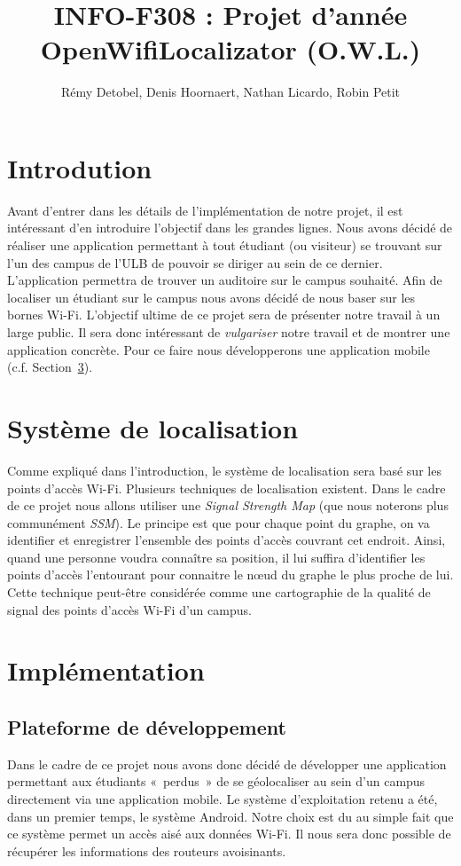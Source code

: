 \documentclass[a4paper,11pt]{article}
\title{INFO-F308 : Projet d'année \\ OpenWifiLocalizator (O.W.L.)}
\author{Rémy Detobel, Denis Hoornaert, Nathan Licardo, Robin Petit}
\begin{document}
\maketitle

\section{Introdution}
	Avant d'entrer dans les détails de l'implémentation de notre projet, il est intéressant d'en introduire l'objectif dans les grandes lignes.
	Nous avons décidé de réaliser une application permettant à tout étudiant (ou visiteur) se trouvant sur l'un des campus de l'ULB de pouvoir se diriger au sein de ce dernier.
	L'application permettra de trouver un auditoire sur le campus souhaité. Afin de localiser un étudiant sur le campus nous avons décidé de nous baser sur les bornes Wi-Fi.
	L'objectif ultime de ce projet sera de présenter notre travail à un large public. Il sera donc intéressant de \textit{vulgariser} notre travail et de montrer
	une application concrète. Pour ce faire nous développerons une application mobile (c.f. Section~\ref{sec:Implémentation}).

\section{Système de localisation}
	Comme expliqué dans l'introduction, le système de localisation sera basé sur les points d'accès Wi-Fi. Plusieurs techniques de localisation existent.
	Dans le cadre de ce projet nous allons utiliser une \textit{Signal Strength Map} (que nous noterons plus communément \textit{SSM}).
	Le principe est que pour chaque point du graphe, on va identifier et enregistrer l'ensemble des points d'accès couvrant cet endroit.
	Ainsi, quand une personne voudra connaître sa position, il lui suffira d'identifier les points d'accès l'entourant pour connaitre le nœud du graphe le plus proche de lui.
	Cette technique peut-être considérée comme une cartographie de la qualité de signal des points d'accès Wi-Fi d'un campus.

\section{Implémentation}\label{sec:Implémentation}
	\subsection{Plateforme de développement}
		Dans le cadre de ce projet nous avons donc décidé de développer une application permettant aux étudiants «~perdus~» de se géolocaliser au sein d'un campus directement
		via une application mobile. Le système d'exploitation retenu a été, dans un premier temps, le système Android. Notre choix est du au simple fait que ce système permet un
		accès aisé aux données Wi-Fi. Il nous sera donc possible de récupérer les informations des routeurs avoisinants.
\end{document}
